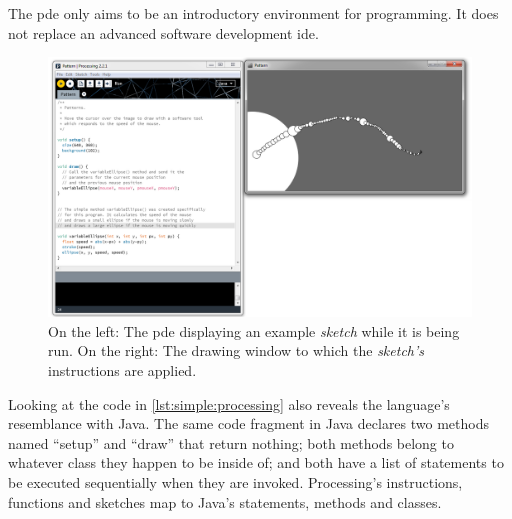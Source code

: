 \documentclass{./llncs2e/llncs}
\begin{document}
	The \ac{pde} only aims to be an introductory environment for programming. 
	It does not replace an advanced software development \ac{ide}.
	
	\begin{figure}
		\centering
		\includegraphics[width=1.0\textwidth]{img/proc_dev_env}
		\caption{On the left: The \ac{pde} displaying an example \emph{sketch} while it is being run. On the right: The drawing window to which the \emph{sketch's} instructions are applied.}
		\label{fig:proc:dev:env}
	\end{figure} 
	
	Looking at the code in \ref{lst:simple:processing} also reveals the language's resemblance with Java. 
	The same code fragment in Java declares two methods named ``setup'' and ``draw'' that return nothing; both methods belong to whatever class they happen to be inside of; and both have a list of statements to be executed sequentially when they are invoked. 
	Processing's instructions, functions and sketches map to Java's statements, methods and classes.
	
\end{document}
